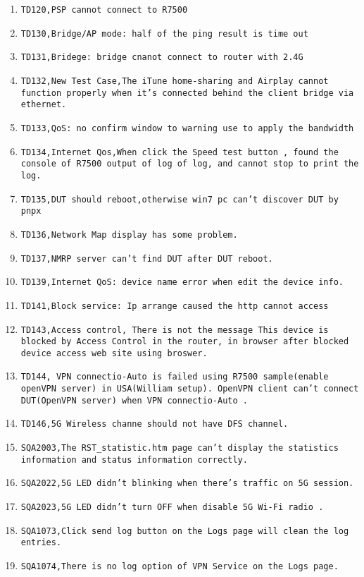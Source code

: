 \documentclass[12pt]{report}
\begin{document}
\begin{itemize}
\begin{enumerate}
		\item \texttt{TD120,PSP cannot connect to R7500}
		\item \texttt{TD130,Bridge/AP mode: half of the ping result is time out}
		\item \texttt{TD131,Bridege: bridge cnanot connect to router with 2.4G}
		\item \texttt{TD132,New Test Case,The iTune home-sharing and Airplay cannot function properly when it's connected behind the client bridge via ethernet.}
		\item \texttt{TD133,QoS: no confirm window to warning use to apply the bandwidth}
		\item \texttt{TD134,Internet Qos,When click the Speed test button , found the console of R7500 output of log of log, and cannot stop to print the log.}
		\item \texttt{TD135,DUT should reboot,otherwise win7 pc can't discover DUT by pnpx}
		\item \texttt{TD136,Network Map display has some problem.}
		\item \texttt{TD137,NMRP server can't find DUT after DUT reboot.}
		\item \texttt{TD139,Internet QoS: device name error when edit the device info.}
		\item \texttt{TD141,Block service: Ip arrange caused the http cannot access}
		\item \texttt{TD143,Access control, There is not the message This device is blocked by Access Control in the router, in browser after blocked device access web site using broswer.}
		\item \texttt{TD144, VPN connectio-Auto is failed using R7500 sample(enable openVPN server) in USA(William setup). OpenVPN client can't connect DUT(OpenVPN server) when VPN connectio-Auto .}
		\item \texttt{TD146,5G Wireless channe should not have DFS channel.}
		\item \texttt{SQA2003,The RST\_statistic.htm page can't display the statistics information and status information correctly.}
		\item \texttt{SQA2022,5G LED didn't blinking when there's traffic on 5G session.}
		\item \texttt{SQA2023,5G LED didn't turn OFF when disable 5G Wi-Fi radio .}
		\item \texttt{SQA1073,Click send log button on the Logs page will clean the log entries.}
		\item \texttt{SQA1074,There is no log option of VPN Service on the Logs page.}

\end{enumerate}
\end{itemize}
\end{document}

